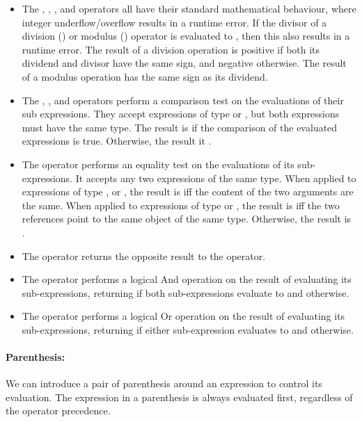 \documentclass[a4paper]{article}
\theoremstyle{definition}
\begin{document}
\begin{itemize}
\item The \lit{*}, \lit{/}, \lit{\%}, \lit{+} and \lit{-} operators 
all have their standard mathematical behaviour, where integer underflow/overflow results in a runtime error.
If the divisor of a division (\lit{/}) or modulus (\lit{\%}) operator is evaluated to , then this also results in a runtime error.
The result of a division operation is positive if both its dividend and divisor have the same sign, and negative otherwise.
The result of a modulus operation has the same sign as its dividend.

\item The \lit{>}, \lit{>=}, \lit{<} and \lit{<=} operators perform a comparison test on the evaluations of their sub expressions.
They accept expressions of type  or , but both expressions must have the same type.
The result is  if the comparison of the evaluated expressions is true.
Otherwise, the result it .

\item The \lit{==} operator performs an equality test on the evaluations of its sub-expressions.
It accepts any two expressions of the same type.
When applied to expressions of type ,  or , the result is  iff the content of the two arguments are the same.
When applied to expressions of type  or , the result is  iff the two references point to the same object of the same type.
Otherwise, the result is . 

\item The \lit{!=} operator returns the opposite result to the \lit{==} operator. 

\item The \lit{\&\&} operator performs a logical And operation on the result of evaluating its sub-expressions,
returning  if both sub-expressions evaluate to  and  otherwise. 

\item The \lit{||} operator performs a logical Or operation on the result of evaluating its sub-expressions,
returning  if either sub-expression evaluates to  and  otherwise.
\end{itemize}

\paragraph{Parenthesis:}
We can introduce a pair of parenthesis around an expression to control its evaluation. 
The expression in a parenthesis is always evaluated first, regardless of the operator precedence. 
\end{document}
